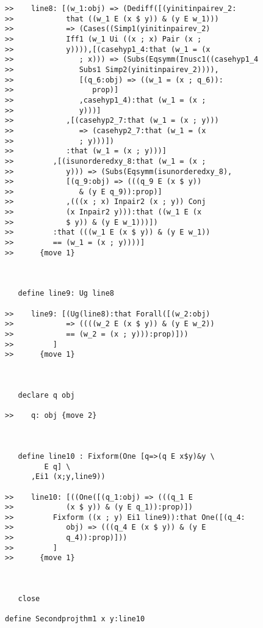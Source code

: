 \documentclass[12pt]{article}
\begin{document}
\begin{verbatim}
>>    line8: [(w_1:obj) => (Dediff([(yinitinpairev_2:
>>            that ((w_1 E (x $ y)) & (y E w_1)))
>>            => (Cases((Simp1(yinitinpairev_2)
>>            Iff1 (w_1 Ui ((x ; x) Pair (x ;
>>            y)))),[(casehyp1_4:that (w_1 = (x
>>               ; x))) => (Subs(Eqsymm(Inusc1((casehyp1_4
>>               Subs1 Simp2(yinitinpairev_2)))),
>>               [(q_6:obj) => ((w_1 = (x ; q_6)):
>>                  prop)]
>>               ,casehyp1_4):that (w_1 = (x ;
>>               y)))]
>>            ,[(casehyp2_7:that (w_1 = (x ; y)))
>>               => (casehyp2_7:that (w_1 = (x
>>               ; y)))])
>>            :that (w_1 = (x ; y)))]
>>         ,[(isunorderedxy_8:that (w_1 = (x ;
>>            y))) => (Subs(Eqsymm(isunorderedxy_8),
>>            [(q_9:obj) => (((q_9 E (x $ y))
>>               & (y E q_9)):prop)]
>>            ,(((x ; x) Inpair2 (x ; y)) Conj
>>            (x Inpair2 y))):that ((w_1 E (x
>>            $ y)) & (y E w_1)))])
>>         :that (((w_1 E (x $ y)) & (y E w_1))
>>         == (w_1 = (x ; y))))]
>>      {move 1}



   define line9: Ug line8

>>    line9: [(Ug(line8):that Forall([(w_2:obj)
>>            => ((((w_2 E (x $ y)) & (y E w_2))
>>            == (w_2 = (x ; y))):prop)]))
>>         ]
>>      {move 1}



   declare q obj

>>    q: obj {move 2}



   define line10 : Fixform(One [q=>(q E x$y)&y \
         E q] \
      ,Ei1 (x;y,line9))

>>    line10: [((One([(q_1:obj) => (((q_1 E
>>            (x $ y)) & (y E q_1)):prop)])
>>         Fixform ((x ; y) Ei1 line9)):that One([(q_4:
>>            obj) => (((q_4 E (x $ y)) & (y E
>>            q_4)):prop)]))
>>         ]
>>      {move 1}



   close

define Secondprojthm1 x y:line10


\end{verbatim}
\end{document}
